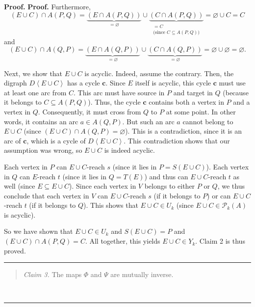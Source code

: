 \documentclass[numbers=enddot,12pt,final,onecolumn,notitlepage]{scrartcl}%
\theoremstyle{definition}
\newenvironment{statement}{\begin{quote}}{\end{quote}}
\newenvironment{proof}[1][Proof]{\noindent\textbf{#1.} }{\ \rule{0.5em}{0.5em}}
\theoremstyle{plainsl}
\begin{document}
\begin{proof}
\begin{proof}
Furthermore,%
\[
\left(  E\cup C\right)  \cap A\left(  P,Q\right)  =\underbrace{\left(  E\cap
A\left(  P,Q\right)  \right)  }_{=\varnothing}\cup\underbrace{\left(  C\cap
A\left(  P,Q\right)  \right)  }_{\substack{=C\\\text{(since }C\subseteq
A\left(  P,Q\right)  \text{)}}}=\varnothing\cup C=C
\]
and%
\[
\left(  E\cup C\right)  \cap A\left(  Q,P\right)  =\underbrace{\left(  E\cap
A\left(  Q,P\right)  \right)  }_{=\varnothing}\cup\underbrace{\left(  C\cap
A\left(  Q,P\right)  \right)  }_{=\varnothing}=\varnothing\cup\varnothing
=\varnothing.
\]


Next, we show that $E\cup C$ is acyclic. Indeed, assume the contrary. Then,
the digraph $D\left\langle E\cup C\right\rangle $ has a cycle $\mathbf{c}$.
Since $E$ itself is acyclic, this cycle $\mathbf{c}$ must use at least one arc
from $C$. This arc must have source in $P$ and target in $Q$ (because it
belongs to $C\subseteq A\left(  P,Q\right)  $). Thus, the cycle $\mathbf{c}$
contains both a vertex in $P$ and a vertex in $Q$. Consequently, it must cross
from $Q$ to $P$ at some point. In other words, it contains an arc $a\in
A\left(  Q,P\right)  $. But such an arc $a$ cannot belong to $E\cup C$ (since
$\left(  E\cup C\right)  \cap A\left(  Q,P\right)  =\varnothing$). This is a
contradiction, since it is an arc of $\mathbf{c}$, which is a cycle of
$D\left\langle E\cup C\right\rangle $. This contradiction shows that our
assumption was wrong, so $E\cup C$ is indeed acyclic.

Each vertex in $P$ can $E\cup C$-reach $s$ (since it lies in $P=S\left(  E\cup
C\right)  $). Each vertex in $Q$ can $E$-reach $t$ (since it lies in
$Q=T\left(  E\right)  $) and thus can $E\cup C$-reach $t$ as well (since
$E\subseteq E\cup C$). Since each vertex in $V$ belongs to either $P$ or $Q$,
we thus conclude that each vertex in $V$ can $E\cup C$-reach $s$ (if it
belongs to $P$) or can $E\cup C$-reach $t$ (if it belongs to $Q$). This shows
that $E\cup C\in U_{k}$ (since $E\cup C\in\mathcal{P}_{k}\left(  A\right)  $
is acyclic).

So we have shown that $E\cup C\in U_{k}$ and $S\left(  E\cup C\right)  =P$ and
$\left(  E\cup C\right)  \cap A\left(  P,Q\right)  =C$. All together, this
yields $E\cup C\in Y_{k}$. Claim 2 is thus proved.
\end{proof}

\begin{statement}
\textit{Claim 3.} The maps $\Phi$ and $\Psi$ are mutually inverse.
\end{statement}


\end{proof}
\end{document}
